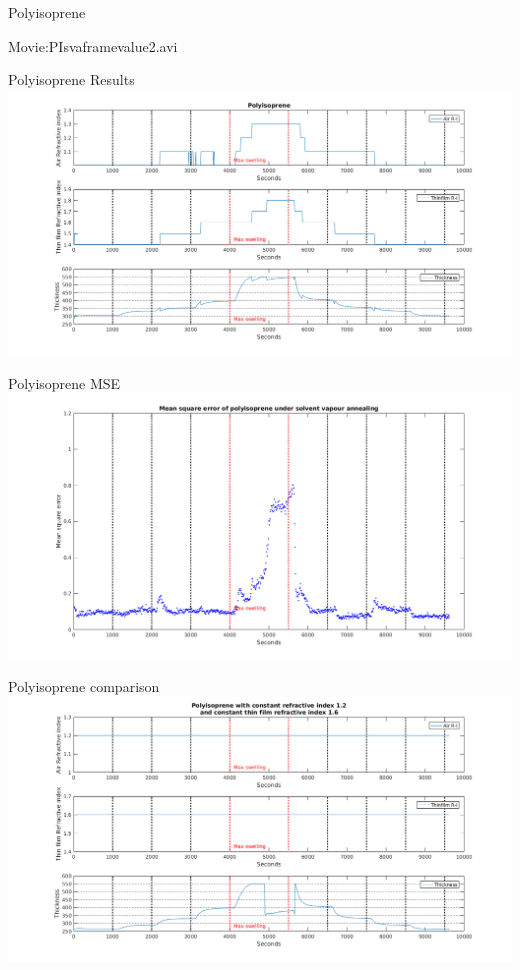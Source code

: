 \documentclass[10pt]{beamer}
\begin{document}
\begin{frame}{Polyisoprene}
\begin{center}
\Huge Movie:PIsvaframevalue2.avi
\end{center}
\end{frame}

\begin{frame}{Polyisoprene Results}
\includegraphics[width=\textwidth]{PIswelling1.png}
\end{frame}

\begin{frame}{Polyisoprene MSE}
\includegraphics[width=\textwidth]{PIswelling2.png}
\end{frame}

\begin{frame}{Polyisoprene comparison}
	\centering
	\includegraphics[width=\textwidth]{PIn12n16AVG1.png}
\end{frame}
\end{document}
